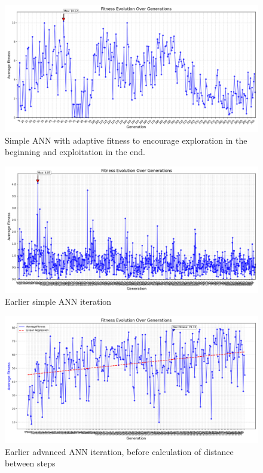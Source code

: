 \documentclass[final,5p,times,twocolumn,authoryear]{elsarticle}
\begin{document}
\begin{figure}[H]
    \centering
    \includegraphics[width=1\linewidth]{figures/ann_simples_leonor_params2.png}
    \caption{Simple ANN with adaptive fitness to encourage exploration in the beginning and exploitation in the end.}
    \label{fig:enter-label}
\end{figure}

\begin{figure}[H]
    \centering
    \includegraphics[width=1\linewidth]{figures/aold_ann_simples_params2.png}
    \caption{Earlier simple ANN iteration}
    \label{fig:enter-label}
\end{figure}

\begin{figure}[H]
    \centering
    \includegraphics[width=1\linewidth]{figures/APPENDIX_ann_advance_best_first.png}
    \caption{Earlier advanced ANN iteration, before calculation of distance between steps}
    \label{fig:enter-label}
\end{figure}

\end{document}
